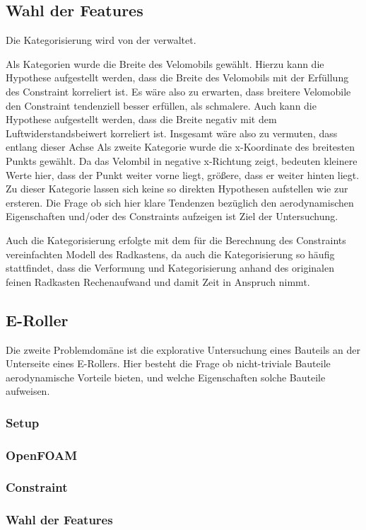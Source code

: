 \subsection{Wahl der Features}
Die Kategorisierung wird von der  verwaltet.

Als Kategorien wurde die Breite des Velomobils gewählt.
Hierzu kann die Hypothese aufgestellt werden, dass die Breite des Velomobils mit der Erfüllung des Constraint korreliert ist. Es wäre also zu erwarten, dass breitere Velomobile den Constraint tendenziell besser erfüllen, als schmalere.
Auch kann die Hypothese aufgestellt werden, dass die Breite negativ mit dem Luftwiderstandsbeiwert korreliert ist.
Insgesamt wäre also zu vermuten, dass entlang dieser Achse
Als zweite Kategorie wurde die x-Koordinate des breitesten Punkts gewählt.
Da das Velombil in negative x-Richtung zeigt, bedeuten kleinere Werte hier, dass der Punkt weiter vorne liegt, größere, dass er weiter hinten liegt.
Zu dieser Kategorie lassen sich keine so direkten Hypothesen aufstellen wie zur ersteren.
Die Frage ob sich hier klare Tendenzen bezüglich den aerodynamischen Eigenschaften und/oder des Constraints aufzeigen ist Ziel der Untersuchung.

Auch die Kategorisierung erfolgte mit dem für die Berechnung des Constraints vereinfachten Modell des Radkastens, da auch die Kategorisierung so häufig stattfindet, dass die Verformung und Kategorisierung anhand des originalen feinen Radkasten Rechenaufwand und damit Zeit in Anspruch nimmt.

\subsection{E-Roller}


Die zweite Problemdomäne ist die explorative Untersuchung eines Bauteils an der Unterseite eines E-Rollers.
Hier besteht die Frage ob nicht-triviale Bauteile aerodynamische Vorteile bieten, und welche Eigenschaften solche Bauteile aufweisen.

\subsubsection{Setup}
\subsubsection{OpenFOAM}
\subsubsection{Constraint}
\subsubsection{Wahl der Features}





